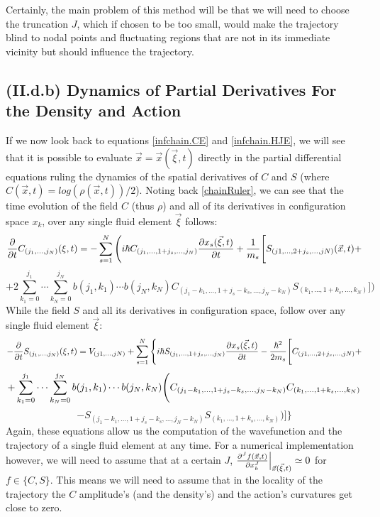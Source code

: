 \documentclass[11pt, a4paper]{article} %
\begin{document}
Certainly, the main problem of this method will be that we will need to choose the truncation $J$, which if chosen to be too small, would make the trajectory blind to nodal points and fluctuating regions that are not in its immediate vicinity but should influence the trajectory.\vspace{-0.1cm}

\subsection*{(II.d.b) Dynamics of Partial Derivatives For the Density and Action\vspace{-0.1cm}}

If we now look back to equations \eqref{infchain.CE} and \eqref{infchain.HJE}, we will see that it is possible to evaluate $\vec{x}=\vec{x}(\vec{\xi},t)$ directly in the partial differential equations ruling the dynamics of the spatial derivatives of $C$ and $S$ (where $C(\vec{x},t)=log(\rho(\vec{x},t))/2$). Noting back \eqref{chainRuler}, we can see that the time evolution of the field $C$ (thus $\rho$) and all of its derivatives in configuration space $x_k$, over any single fluid element $\vec{\xi}$ follows:\vspace{-0.1cm}
\begin{equation}\label{infchain.CE.L}
\pdv{}{t}C_{(j_1,...,j_N)}(\xi,t)=-\sum_{s=1}^N \Bigg(i\hbar C_{(j_1,...,1+j_s,...,j_N)}\pdv{x_s(\vec{\xi},t)}{t} + \frac{1}{m_s} \Bigg[S_{(j1,...,2+j_s,...,jN)}(\vec{x},t)+
\end{equation}
$$
+2 \sum_{k_1=0}^{j_1}\cdots\sum_{k_N=0}^{j_N} b(j_1,k_1)\cdots b(j_N,k_N)C_{(j_1-k_1,...,1+j_s-k_s,...,j_N-k_N)}S_{(k_1,...,1+k_s,...,k_N)} \Bigg]\bigg)
$$
While the field $S$ and all its derivatives in configuration space, follow over any single fluid element $\vec{\xi}$:\vspace{-0.1cm}
\begin{equation}\label{infchain.HJE.L}
-\pdv{}{t}S_{(j_1,...,j_N)}(\xi,t)=V_{(j1,...,jN)}+\sum_{s=1}^N\Bigg\{ i\hbar S_{(j_1,...,1+j_s,...,j_N)}\pdv{x_s(\vec{\xi},t)}{t}-\frac{\hbar^2}{2m_s} \Bigg[ C_{(j1,...,2+j_s,...,jN)}+\vspace{-0.1cm}
\end{equation}
$$
+\sum_{k_1=0}^{j_1}\cdots\sum_{k_N=0}^{j_N} b(j_1,k_1)\cdots b(j_N,k_N) \Bigg( C_{(j_1-k_1,...,1+j_s-k_s,...,j_N-k_N)}C_{(k_1,...,1+k_s,...,k_N)} \vspace{-0.1cm}
$$
$$
-S_{(j_1-k_1,...,1+j_s-k_s,...,j_N-k_N)}S_{(k_1,...,1+k_s,...,k_N)}  \Bigg)\Bigg]\Bigg\}
$$
Again, these equations allow us the computation of the wavefunction and the trajectory of a single fluid element at any time. For a numerical implementation however, we will need to assume that at a certain $J$, $\pdv[J]{f(\vec{x},t)}{x_k}\Big\rvert_{\vec{x}(\vec{\xi},t)}\simeq 0$ for $f\in\{ C,S\}$. This means we will need to assume that in the locality of the trajectory the $C$ amplitude's (and the density's) and the action's curvatures get close to zero.
\end{document}
